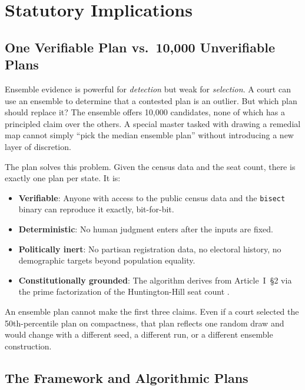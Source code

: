 \section{Statutory Implications}
\label{sec:statutory}

\subsection{One Verifiable Plan vs.\ 10,000 Unverifiable Plans}

Ensemble evidence is powerful for \emph{detection} but weak for \emph{selection}.
A court can use an ensemble to determine that a contested plan is an outlier.
But which plan should replace it?  The ensemble offers 10,000 candidates,
none of which has a principled claim over the others.  A special master tasked
with drawing a remedial map cannot simply ``pick the median ensemble plan''
without introducing a new layer of discretion.

The \ar{} plan solves this problem.  Given the census data and the seat count,
there is exactly one \ar{} plan per state.  It is:

\begin{itemize}
  \item \textbf{Verifiable}: Anyone with access to the public census data
    and the \texttt{bisect} binary can reproduce it exactly, bit-for-bit.
  \item \textbf{Deterministic}: No human judgment enters after the inputs
    are fixed.
  \item \textbf{Politically inert}: No partisan registration data, no
    electoral history, no demographic targets beyond population equality.
  \item \textbf{Constitutionally grounded}: The \ar{} algorithm derives
    from Article~I~\S2 via the prime factorization of the Huntington-Hill
    seat count \citep{dellaLibera2026b11}.
\end{itemize}

An ensemble plan cannot make the first three claims.  Even if a court selected
the 50th-percentile plan on compactness, that plan reflects one random draw
and would change with a different seed, a different run, or a different
ensemble construction.

\subsection{The \texorpdfstring{\rucho{}}{Rucho} Framework and Algorithmic Plans}

